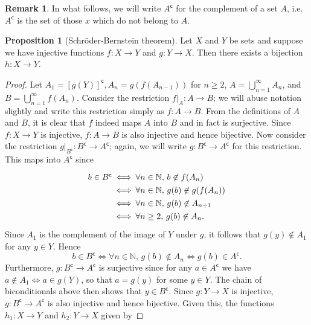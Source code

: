 \documentclass[12pt]{article}
\theoremstyle{definition}
\newtheorem{proposition}[definition]{Proposition}
\newtheorem*{remark}{Remark}
\begin{document}
\begin{remark}
    In what follows, we will write \( A^{\mathsf{c}} \) for the complement of a set \( A \), i.e.\ \( A^{\mathsf{c}} \) is the set of those \( x \) which do not belong to \( A \).
\end{remark}

\begin{proposition}[Schröder-Bernstein theorem]
\label{prop:schroder-bernstein_theorem}
    Let \( X \) and \( Y \) be sets and suppose we have injective functions \( f : X \to Y \) and \( g : Y \to X \). Then there exists a bijection \( h : X \to Y \).
\end{proposition}

\begin{proof}
    Let \( A_1 = [g(Y)]^{\mathsf{c}}, A_n = g(f(A_{n-1})) \) for \( n \geq 2 \), \( A = \bigcup_{n=1}^{\infty} A_n \), and \( B = \bigcup_{n=1}^{\infty} f(A_n) \). Consider the restriction \( f|_A : A \to B \); we will abuse notation slightly and write this restriction simply as \( f : A \to B \). From the definitions of \( A \) and \( B \), it is clear that \( f \) indeed maps \( A \) into \( B \) and in fact is surjective. Since \( f : X \to Y \) is injective, \( f : A \to B \) is also injective and hence bijective. Now consider the restriction \( g|_{B^{\mathsf{c}}} : B^{\mathsf{c}} \to A^{\mathsf{c}} \); again, we will write \( g : B^{\mathsf{c}} \to A^{\mathsf{c}} \) for this restriction. This maps into \( A^{\mathsf{c}} \) since
    \[
        \arraycolsep=1pt\def\arraystretch{1.3}
        \begin{array}{rcl}
            b \in B^{\mathsf{c}} & \iff & \forall n \in \mathbb{N},\, b \not\in f(A_n) \\
            & \iff & \forall n \in \mathbb{N},\, g(b) \not\in g(f(A_n)) \\
            & \iff & \forall n \in \mathbb{N},\, g(b) \not\in A_{n+1} \\
            & \iff & \forall n \geq 2,\, g(b) \not\in A_n. \\
        \end{array}
    \]
    Since \( A_1 \) is the complement of the image of \( Y \) under \( g \), it follows that \( g(y) \not\in A_1 \) for any \( y \in Y \). Hence
    \[
        b \in B^{\mathsf{c}} \iff \forall n \in \mathbb{N},\, g(b) \not\in A_n \iff g(b) \in A^{\mathsf{c}}.
    \]
    Furthermore, \( g : B^{\mathsf{c}} \to A^{\mathsf{c}} \) is surjective since for any \( a \in A^{\mathsf{c}} \) we have \( a \not\in A_1 \iff a \in g(Y) \), so that \( a = g(y) \) for some \( y \in Y \). The chain of biconditionals above then shows that \( y \in B^{\mathsf{c}} \). Since \( g : Y \to X \) is injective, \( g : B^{\mathsf{c}} \to A^{\mathsf{c}} \) is also injective and hence bijective. Given this, the functions \( h_1 : X \to Y \) and \( h_2 : Y \to X \) given by

\end{proof}
\end{document}
